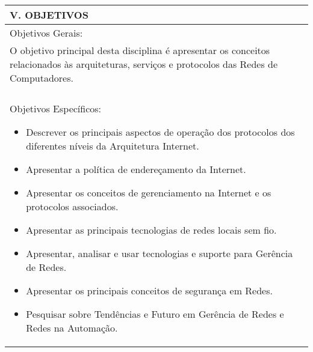 \documentclass[12pt]{article}
\begin{document}
\newpage



\begin{longtable}{|L{1.025\textwidth}|} \hline
%
{\bf V. OBJETIVOS } \\ \hline
Objetivos Gerais: \\

O objetivo principal desta disciplina é apresentar os conceitos relacionados às arquiteturas, serviços e protocolos das Redes de Computadores.\\
\\
Objetivos Específicos:
\begin{itemize}
\item Descrever os principais aspectos de operação dos protocolos dos diferentes níveis da Arquitetura Internet.
\item Apresentar a política de endereçamento da Internet.
\item Apresentar os conceitos de gerenciamento na Internet e os protocolos associados.
\item Apresentar as principais tecnologias de redes locais sem fio.
\item Apresentar, analisar e usar tecnologias e suporte para Gerência de Redes.
\item Apresentar os principais conceitos de segurança em Redes.
\item Pesquisar sobre Tendências e Futuro em Gerência de Redes e Redes na Automação.
\end{itemize}
\\ \hline
\end{longtable}
\end{document}
